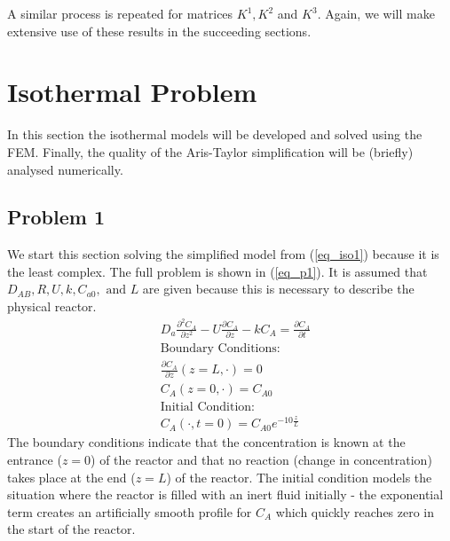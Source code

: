 \documentclass[11pt,fleqn]{article}
\theoremstyle{defstyle}
\begin{document}
A similar process is repeated for matrices $K^1, K^2$ and $K^3$. Again, we will make extensive use of these results in the succeeding sections.

\section{Isothermal Problem}
In this section the isothermal models will be developed and solved using the FEM. Finally, the quality of the Aris-Taylor simplification will be (briefly) analysed numerically.  
\subsection{Problem 1}
\label{section_isop1}
We start this section solving the simplified model from (\ref{eq_iso1}) because it is the least complex. The full problem is shown in (\ref{eq_p1}). It is assumed that $D_{AB}, R, U, k, C_{a0},\text{ and } L$ are given because this is necessary to describe the physical reactor.  
\begin{equation}
\begin{aligned}
&D_a \frac{\partial^2 C_A}{\partial z^2} - U \frac{\partial C_A}{\partial z} - kC_A = 
\frac{\partial C_A}{\partial t} \\
&\text{Boundary Conditions:} \\
&\frac{\partial C_A}{\partial z}(z=L, \cdot) = 0\\
&C_A(z=0, \cdot) = C_{A0} \\
&\text{Initial Condition:} \\
& C_A(\cdot, t= 0) = C_{A0}e^{-10\frac{z}{L}}
\end{aligned}
\label{eq_p1}
\end{equation}
The boundary conditions indicate that the concentration is known at the entrance ($z=0$) of the reactor and that no reaction (change in concentration) takes place at the end ($z=L$) of the reactor. The initial condition models the situation where the reactor is filled with an inert fluid initially - the exponential term creates an artificially smooth profile for $C_{A}$ which quickly reaches zero in the start of the reactor. 
\end{document}
